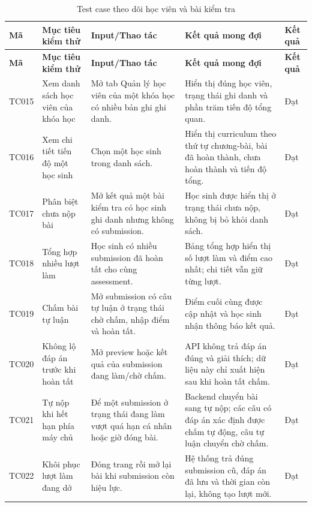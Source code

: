 \documentclass[../DoAn.tex]{subfiles}
\begin{document}
\small
\setlength{\tabcolsep}{3pt}
\renewcommand{\arraystretch}{1.25}
\begin{longtable}{|p{}|p{}|p{}|p{}|p{}|}
\caption{Test case theo dõi học viên và bài kiểm tra}
\label{tab:test_progress_assessment}\\
\hline
\textbf{Mã} & \textbf{Mục tiêu kiểm thử} & \textbf{Input/Thao tác} & \textbf{Kết quả mong đợi} & \textbf{Kết quả} \\ \hline
\endfirsthead
\hline
\textbf{Mã} & \textbf{Mục tiêu kiểm thử} & \textbf{Input/Thao tác} & \textbf{Kết quả mong đợi} & \textbf{Kết quả} \\ \hline
\endhead
TC015 & Xem danh sách học viên của khóa học & Mở tab Quản lý học viên của một khóa học có nhiều bản ghi ghi danh. & Hiển thị đúng học viên, trạng thái ghi danh và phần trăm tiến độ tổng quan. & Đạt \\ \hline
TC016 & Xem chi tiết tiến độ một học sinh & Chọn một học sinh trong danh sách. & Hiển thị curriculum theo thứ tự chương-bài, bài đã hoàn thành, chưa hoàn thành và tiến độ tổng. & Đạt \\ \hline
TC017 & Phân biệt chưa nộp bài & Mở kết quả một bài kiểm tra có học sinh ghi danh nhưng không có submission. & Học sinh được hiển thị ở trạng thái chưa nộp, không bị bỏ khỏi danh sách. & Đạt \\ \hline
TC018 & Tổng hợp nhiều lượt làm & Học sinh có nhiều submission đã hoàn tất cho cùng assessment. & Bảng tổng hợp hiển thị số lượt làm và điểm cao nhất; chi tiết vẫn giữ từng lượt. & Đạt \\ \hline
TC019 & Chấm bài tự luận & Mở submission có câu tự luận ở trạng thái chờ chấm, nhập điểm và hoàn tất. & Điểm cuối cùng được cập nhật và học sinh nhận thông báo kết quả. & Đạt \\ \hline
TC020 & Không lộ đáp án trước khi hoàn tất & Mở preview hoặc kết quả của submission đang làm/chờ chấm. & API không trả đáp án đúng và giải thích; dữ liệu này chỉ xuất hiện sau khi hoàn tất chấm. & Đạt \\ \hline
TC021 & Tự nộp khi hết hạn phía máy chủ & Để một submission ở trạng thái đang làm vượt quá hạn cá nhân hoặc giờ đóng bài. & Backend chuyển bài sang tự nộp; các câu có đáp án xác định được chấm tự động, câu tự luận chuyển chờ chấm. & Đạt \\ \hline
TC022 & Khôi phục lượt làm đang dở & Đóng trang rồi mở lại bài khi submission còn hiệu lực. & Hệ thống trả đúng submission cũ, đáp án đã lưu và thời gian còn lại, không tạo lượt mới. & Đạt \\ \hline
\end{longtable}
\normalsize
\end{document}
